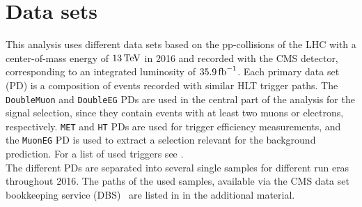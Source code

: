 \section{Data sets}\label{sec:datasets}
This analysis uses different data sets based on the pp-collisions of the LHC with a center-of-mass energy of $13\,\text{Te\hspace{-.08em}V}$ in 2016 and recorded with the CMS detector, corresponding to an integrated luminosity of $35.9\mbox{\ensuremath{\,\text{fb}^\text{$-$1}}}$. Each primary data set (PD) is a composition of events recorded with similar HLT trigger paths. The \texttt{DoubleMuon} and \texttt{DoubleEG} PDs are used in the central part of the analysis for the signal selection, since they contain events with at least two muons or electrons, respectively. \texttt{MET} and \texttt{HT} PDs are used for trigger efficiency measurements, and the \texttt{MuonEG} PD is used to extract a selection relevant for the background prediction. For a list of used triggers see .\\
The different PDs are separated into several single samples for different run eras throughout 2016.
The paths of the used samples, available via the CMS data set bookkeeping service (DBS)~\cite{DASBookkeeping} are listed in  in the additional material.




